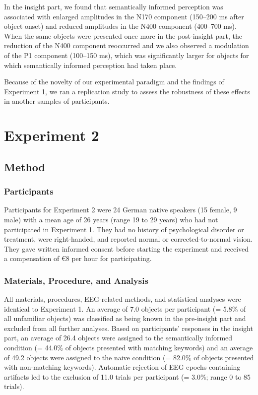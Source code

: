 \documentclass[
  english,
  doc,12pt,twoside,floatsintext]{apa7}
\begin{document}
In the insight part, we found that semantically informed perception was associated with enlarged amplitudes in the N170 component (150--200 ms after object onset) and reduced amplitudes in the N400 component (400--700 ms). When the same objects were presented once more in the post-insight part, the reduction of the N400 component reoccurred and we also observed a modulation of the P1 component (100--150 ms), which was significantly larger for objects for which semantically informed perception had taken place.

Because of the novelty of our experimental paradigm and the findings of Experiment 1, we ran a replication study to assess the robustness of these effects in another samples of participants.

\hypertarget{experiment-2}{%
\section{Experiment 2}\label{experiment-2}}

\hypertarget{method-1}{%
\subsection{Method}\label{method-1}}

\hypertarget{participants-1}{%
\subsubsection{Participants}\label{participants-1}}

Participants for Experiment 2 were 24 German native speakers (15 female, 9 male) with a mean age of 26 years (range 19 to 29 years) who had not participated in Experiment 1. They had no history of psychological disorder or treatment, were right-handed, and reported normal or corrected-to-normal vision. They gave written informed consent before starting the experiment and received a compensation of €8 per hour for participating.

\hypertarget{materials-procedure-and-analysis}{%
\subsubsection{Materials, Procedure, and Analysis}\label{materials-procedure-and-analysis}}

All materials, procedures, EEG-related methods, and statistical analyses were identical to Experiment 1. An average of 7.0 objects per participant (= 5.8\% of all unfamiliar objects) was classified as being known in the pre-insight part and excluded from all further analyses. Based on participants' responses in the insight part, an average of 26.4 objects were assigned to the semantically informed condition (= 44.0\% of objects presented with matching keywords) and an average of 49.2 objects were assigned to the naive condition (= 82.0\% of objects presented with non-matching keywords). Automatic rejection of EEG epochs containing artifacts led to the exclusion of 11.0 trials per participant (= 3.0\%; range 0 to 85 trials).
\end{document}
